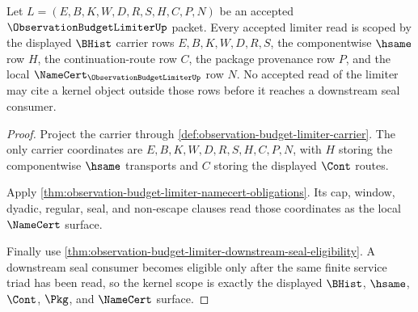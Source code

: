 \begin{theorem}
\label{thm:observation-budget-limiter-kernel-scope}
Let $L=(E,B,K,W,D,R,S,H,C,P,N)$ be an accepted $\ObservationBudgetLimiterUp$ packet. Every accepted limiter read is scoped by the displayed $\BHist$ carrier rows $E,B,K,W,D,R,S$, the componentwise $\hsame$ row $H$, the continuation-route row $C$, the package provenance row $P$, and the local $\NameCert_{\ObservationBudgetLimiterUp}$ row $N$. No accepted read of the limiter may cite a kernel object outside those rows before it reaches a downstream seal consumer.
\end{theorem}
\begin{proof}
Project the carrier through \autoref{def:observation-budget-limiter-carrier}. The only carrier coordinates are $E,B,K,W,D,R,S,H,C,P,N$, with $H$ storing the componentwise $\hsame$ transports and $C$ storing the displayed $\Cont$ routes.

Apply \autoref{thm:observation-budget-limiter-namecert-obligations}. Its cap, window, dyadic, regular, seal, and non-escape clauses read those coordinates as the local $\NameCert$ surface.

Finally use \autoref{thm:observation-budget-limiter-downstream-seal-eligibility}. A downstream seal consumer becomes eligible only after the same finite service triad has been read, so the kernel scope is exactly the displayed $\BHist$, $\hsame$, $\Cont$, $\Pkg$, and $\NameCert$ surface.
\end{proof}

